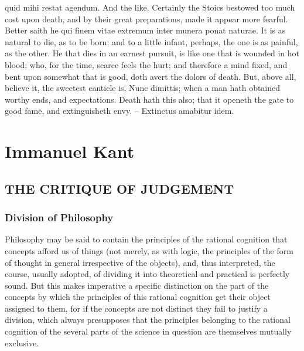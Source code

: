 \documentclass[12pt]{article}
\begin{document}
quid mihi restat agendum. And the like. Certainly the Stoics
bestowed too much cost upon death, and by their great preparations,
made it appear more fearful. Better saith he qui finem vitae
extremum inter munera ponat naturae. It is as natural to die, as to be
born; and to a little infant, perhaps, the one is as painful, as the
other. He that dies in an earnest pursuit, is like one that is wounded
in hot blood; who, for the time, scarce feels the hurt; and
therefore a mind fixed, and bent upon somewhat that is good, doth
avert the dolors of death. But, above all, believe it, the sweetest
canticle is, Nunc dimittis; when a man hath obtained worthy ends,
and expectations. Death hath this also; that it openeth the gate to
good fame, and extinguisheth envy. -- Extinctus amabitur idem.

\chapter{Immanuel Kant}
\section{THE CRITIQUE OF JUDGEMENT}
\subsection{Division of Philosophy}

  Philosophy may be said to contain the principles of the rational
cognition that concepts afford us of things (not merely, as with
logic, the principles of the form of thought in general irrespective
of the objects), and, thus interpreted, the course, usually adopted,
of dividing it into theoretical and practical is perfectly sound.
But this makes imperative a specific distinction on the part of the
concepts by which the principles of this rational cognition get
their object assigned to them, for if the concepts are not distinct
they fail to justify a division, which always presupposes that the
principles belonging to the rational cognition of the several parts of
the science in question are themselves mutually exclusive.
\end{document}
